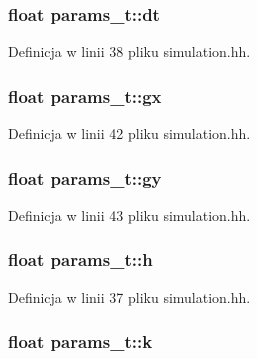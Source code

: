 \subsubsection[{dt}]{\setlength{\rightskip}{0pt plus 5cm}float params\+\_\+t\+::dt}\label{structparams__t_a81fc6596e9b1446442ebf3eef2c3fb01}


Definicja w linii 38 pliku simulation.\+hh.

\hypertarget{structparams__t_a9f3f70c0cdedcb053c9d45c2e41e67b6}{}
\subsubsection[{gx}]{\setlength{\rightskip}{0pt plus 5cm}float params\+\_\+t\+::gx}\label{structparams__t_a9f3f70c0cdedcb053c9d45c2e41e67b6}


Definicja w linii 42 pliku simulation.\+hh.

\hypertarget{structparams__t_a0da484b4cc6a542875aa7b92e200f507}{}
\subsubsection[{gy}]{\setlength{\rightskip}{0pt plus 5cm}float params\+\_\+t\+::gy}\label{structparams__t_a0da484b4cc6a542875aa7b92e200f507}


Definicja w linii 43 pliku simulation.\+hh.

\hypertarget{structparams__t_a27d76064f2ae0cb93a0956027cfcc19b}{}
\subsubsection[{h}]{\setlength{\rightskip}{0pt plus 5cm}float params\+\_\+t\+::h}\label{structparams__t_a27d76064f2ae0cb93a0956027cfcc19b}


Definicja w linii 37 pliku simulation.\+hh.

\hypertarget{structparams__t_a97ee2783cf89cee1151be3250e9054b3}{}
\subsubsection[{k}]{\setlength{\rightskip}{0pt plus 5cm}float params\+\_\+t\+::k}\label{structparams__t_a97ee2783cf89cee1151be3250e9054b3}


